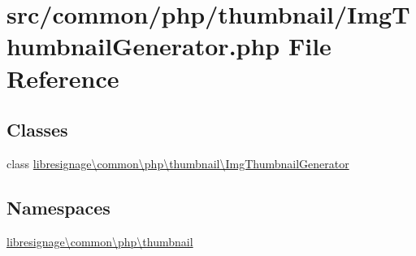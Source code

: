 \hypertarget{ImgThumbnailGenerator_8php}{}\section{src/common/php/thumbnail/\+Img\+Thumbnail\+Generator.php File Reference}
\label{ImgThumbnailGenerator_8php}
\subsection*{Classes}
\begin{DoxyCompactItemize}
\item 
class \hyperlink{classlibresignage_1_1common_1_1php_1_1thumbnail_1_1ImgThumbnailGenerator}{libresignage\textbackslash{}common\textbackslash{}php\textbackslash{}thumbnail\textbackslash{}\+Img\+Thumbnail\+Generator}
\end{DoxyCompactItemize}
\subsection*{Namespaces}
\begin{DoxyCompactItemize}
\item 
 \hyperlink{namespacelibresignage_1_1common_1_1php_1_1thumbnail}{libresignage\textbackslash{}common\textbackslash{}php\textbackslash{}thumbnail}
\end{DoxyCompactItemize}
